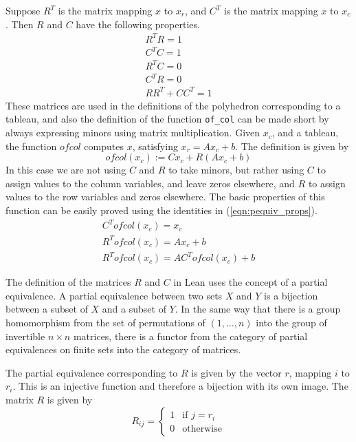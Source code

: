 \documentclass[11pt]{article} %
\begin{document}
Suppose $R^T$ is the matrix mapping $x$ to $x_r$, and $C^T$ is the matrix mapping $x$ to $x_c$. Then $R$ and $C$ have the following properties.
\begin{equation}\label{eqn:pequiv_props}
  \begin{aligned}
    R^TR = 1 \\
    C^TC = 1 \\
    R^TC = 0 \\
    C^TR = 0 \\
    RR^T + CC^T = 1
  \end{aligned}
\end{equation}
These matrices are used in the definitions of the polyhedron corresponding to a tableau, and also the definition of the function \lstinline|of_col| can be made short by always expressing minors using matrix multiplication. Given $x_c$, and a tableau, the function $ofcol$ computes $x$, satisfying $x_r = Ax_c + b$. The definition is given by
\begin{equation}
  ofcol(x_c) := Cx_c + R(Ax_c+b)
\end{equation}
In this case we are not using $C$ and $R$ to take minors, but rather using $C$ to assign values to the column variables, and leave zeros elsewhere, and $R$ to assign values to the row variables and zeros elsewhere. The basic properties of this function can be easily proved using the identities in (\ref{eqn:pequiv_props}).
\begin{equation}
  \begin{aligned}
    C^Tofcol(x_c) = x_c \\
    R^Tofcol(x_c) = Ax_c + b \\
    R^Tofcol(x_c) = AC^Tofcol(x_c) + b
  \end{aligned}
\end{equation}


The definition of the matrices $R$ and $C$ in Lean uses the concept of a partial equivalence. A partial equivalence between two sets $X$ and $Y$ is a bijection between a subset of $X$ and a subset of $Y$. In the same way that there is a group homomorphism from the set of permutations of $(1, \dots, n)$ into the group of invertible $n \times n$ matrices, there is a functor from the category of partial equivalences on finite sets into the category of matrices.

The partial equivalence corresponding to $R$ is given by the vector $r$, mapping $i$ to $r_i$. This is an injective function and therefore a bijection with its own image. The matrix $R$ is given by
\begin{equation}
R_{ij} =
\begin{cases}
1 & \text{if } j = r_i \\
0 & \text{otherwise}
\end{cases}
\end{equation}
\end{document}
